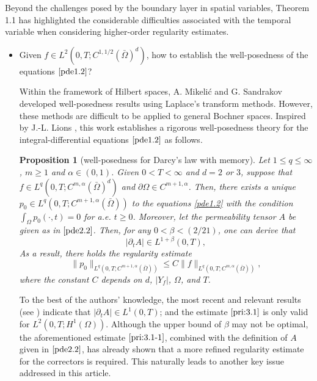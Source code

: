 \documentclass[13pt,CJK]{article}
\theoremstyle{plain}                       %
\newtheorem{proposition}[lemma]{Proposition}
\theoremstyle{remark}
\numberwithin{equation}{section}
\begin{document}
Beyond the challenges posed by the boundary layer in spatial variables, Theorem 1.1 has highlighted the considerable difficulties associated with the temporal variable when considering higher-order regularity estimates.
\begin{itemize}
  \item[Q1.] Given $f\in L^2(0,T;C^{1,1/2}(\bar\Omega)^d)$, how to establish the well-posedness of the equations
  $\eqref{pde1.2}$?

Within the framework of Hilbert spaces, A. Mikeli\'c \cite{Mikelic91}
and G. Sandrakov \cite{Sandrakov97} developed well-posedness results  using
Laplace's transform methods. However, these methods are difficult to be applied to general Bochner spaces. Inspired by J.-L. Lions \cite[pp.170]{Lions81},
this work establishes a rigorous well-posedness theory
for the integral-differential equations $\eqref{pde1.2}$ as follows.

\begin{proposition}[well-posedness for Darcy's law with memory]\label{P:1}
Let $1\leq q\leq \infty$, $m\geq 1$ and $\alpha\in(0,1)$.
Given $0<T<\infty$ and $d=2$ or $3$, suppose that
$f\in L^q(0,T;C^{m,\alpha}(\bar{\Omega}
)^d)$ and $\partial\Omega\in C^{m+1,\alpha}$.
Then, there exists a unique $p_0\in L^q(0,T;C^{m+1,\alpha}(\bar{\Omega}))$
to the equations \eqref{pde1.2}
with the condition $\int_{\Omega}p_0(\cdot,t)=0$ for a.e. $t\geq 0$. Moreover, let
the permeability tensor $A$ be given as in $\eqref{pde2.2}$.
Then, for any $0<\beta<(2/21)$, one can derive that
\begin{equation}\label{pri:3.1-1}
|\partial_tA|\in L^{1+\beta}(0,T),
\end{equation}
As a result, there holds the regularity estimate
\begin{equation}\label{pri:3.1}
\|p_0\|_{L^q(0,T;C^{m+1,\alpha}(\bar{\Omega}))}\leq C
\|f\|_{L^q(0,T;C^{m,\alpha}(\bar{\Omega}))},
\end{equation}
where the constant $C$ depends on $d$, $|Y_f|$, $\Omega$, and $T$.
\end{proposition}
To the best of the authors' knowledge, the most recent and relevant results (see \cite[pp.127]{Sandrakov97}) indicate that
$|\partial_tA|\in L^1(0,T)$; and
the estimate $\eqref{pri:3.1}$ is only valid for $L^2(0,T;H^1(\Omega))$.
Although the upper bound of $\beta$ may not be optimal,
the aforementioned estimate $\eqref{pri:3.1-1}$, combined with the definition of $A$ given in $\eqref{pde2.2}$, has already shown that a more refined regularity estimate for the correctors is required. This naturally leads to another key issue addressed in this article.


\end{itemize}
\end{document}
